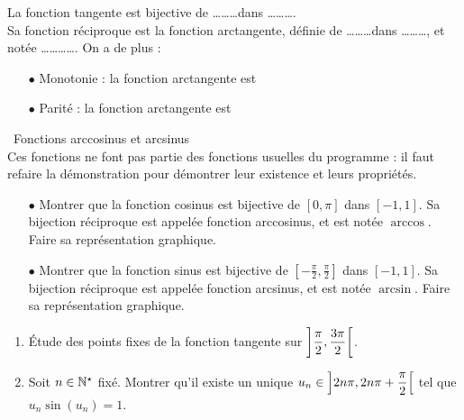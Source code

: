 \documentclass[a4paper, 11pt]{article}
\begin{document}
{{\begin{prop}
	La fonction tangente est bijective de \ldots \ldots \ldots dans  \ldots \ldots \ldots. \\
	Sa fonction r\'eciproque est la fonction arctangente, d\'efinie de  \ldots \ldots \ldots dans  \ldots \ldots \ldots, et not\'ee \ldots \ldots \ldots \ldots. On a de plus :\vsec
	\begin{itemize}
		\item[$\bullet$] Monotonie : la fonction arctangente est \dotfill\vsec
		\item[$\bullet$] Parit\'e :  la fonction arctangente est \dotfill\vsec
	\end{itemize}
\end{prop}



\noindent\ {Fonctions arccosinus et arcsinus}\\

\noindent Ces fonctions ne font pas partie des fonctions usuelles du programme : il faut refaire la d\'emonstration pour d\'emontrer leur existence et leurs propri\'et\'es.

{\footnotesize \begin{exercice}
	\begin{itemize}
		\item[$\bullet$] Montrer que la fonction cosinus est bijective de $[0,\pi]$ dans $[-1,1]$. Sa bijection r\'eciproque est appel\'ee fonction arccosinus, et est not\'ee $\arccos$. Faire sa repr\'esentation graphique.
		\item[$\bullet$] Montrer que la fonction sinus est bijective de $\left[-\frac{\pi}{2},\frac{\pi}{2}\right]$ dans $[-1,1]$. Sa bijection r\'eciproque est appel\'ee fonction arcsinus, et est not\'ee $\arcsin$. Faire sa repr\'esentation graphique.
	\end{itemize}
\end{exercice}}


{\footnotesize \begin{exercice}
	\begin{enumerate}
		\item \'Etude des points fixes de la fonction tangente sur $\left\rbrack \displaystyle\frac{\pi}{2},\displaystyle\frac{3\pi}{2}\right\lbrack$.\\
		\item Soit $n\in\mathbb{N}^{\star}$ fix\'e. Montrer qu'il existe un unique $u_n\in\left\rbrack 2n\pi,2n\pi+\displaystyle\frac{\pi}{2}\right\lbrack$ tel que $u_n\sin{(u_n)}=1$.
	\end{enumerate}
\end{exercice}}

}}
\end{document}
